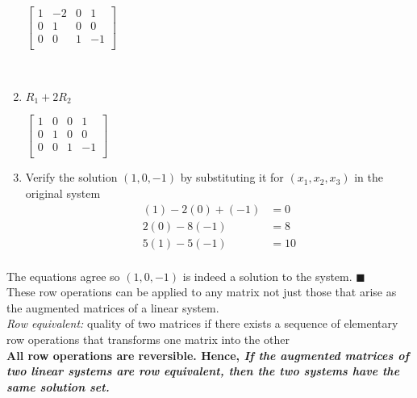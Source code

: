 \documentclass[12pt]{article} %
\begin{document}
\begin{enumerate}
\begin{center}
			$\begin{bmatrix}
				1 & -2 & 0 & 1\\ 
				0 & 1 & 0 & 0\\
				0 & 0 & 1 & -1\\
			 \end{bmatrix}$
		\end{center}
	\leavevmode \\
	\item $R_1 + 2R_2$
		\begin{center}
			$\begin{bmatrix}
				1 & 0 & 0 & 1\\ 
				0 & 1 & 0 & 0\\
				0 & 0 & 1 & -1\\
			 \end{bmatrix}$
		\end{center}
	\item Verify the solution $(1, 0, -1)$ by substituting it for $(x_1, x_2, x_3)$ in the original system
		\begin{align*}
			(1) - 2(0) + (-1) &= 0\\
			2(0) - 8(-1) &= 8\\
			5(1) - 5(-1) &= 10\\
		\end{align*}
\end{enumerate}
The equations agree so $(1, 0, -1)$ is indeed a solution to the system. $\blacksquare$\\

These row operations can be applied to any matrix \textemdash not just those that arise as the augmented matrices of a linear system.\\

\emph{Row equivalent:} quality of two matrices if there exists a sequence of elementary row operations that transforms one matrix into the other\\

\textbf{All row operations are reversible. Hence, \emph{If the augmented matrices of two linear systems are row equivalent, then the two systems have the same solution set.}}
\end{document}

